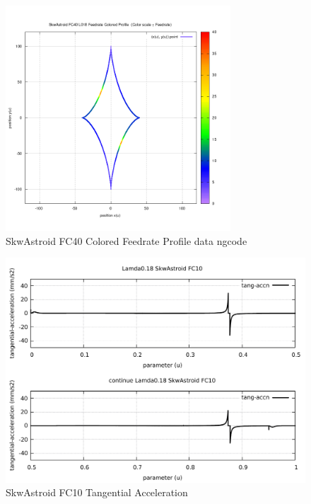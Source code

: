 \begin{figure}
	\caption     {SkwAstroid FC40 Colored Feedrate Profile data ngcode}
	\label{20-img-SkwAstroid-FC40-Colored-Feedrate-Profile-data_ngcode.png}
	\includegraphics[width=0.75\textwidth]{Chap4/appendix/app-SkwAstroid/plots/20-img-SkwAstroid-FC40-Colored-Feedrate-Profile-data_ngcode.png}
\end{figure}

\clearpage
\pagebreak

\begin{figure}
	\caption     {SkwAstroid FC10 Tangential Acceleration}
	\label{21-img-SkwAstroid-FC10-Tangential-Acceleration.pdf}
	\includegraphics[width=1.00\textwidth]{Chap4/appendix/app-SkwAstroid/plots/21-img-SkwAstroid-FC10-Tangential-Acceleration.pdf}
\end{figure}


